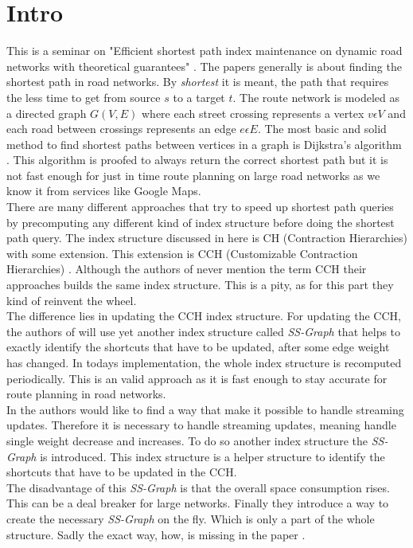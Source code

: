 \documentclass[twocolumn]{article}
\begin{document}


\section{Intro}

This is a seminar on "Efficient shortest path index maintenance on dynamic
road networks with theoretical guarantees" \cite{Ouyang2020}. The papers generally is
about finding the shortest path in road networks. By \textit{shortest} it is meant,
the path that requires the less time to get from source $s$ to a target $t$. The route
network is modeled as a directed graph $G(V,E)$ where each street crossing represents a
vertex $v \epsilon V$ and each road between crossings represents an edge $e \epsilon E$.
The most basic and solid method to find shortest paths between vertices in a graph is
Dijkstra's algorithm \cite{Dijkstra1959}. This algorithm is proofed to always return the
correct shortest path but it is not fast enough for just in time route planning on large
road networks as we know it from services like Google Maps.
\\
There are many
different approaches that try to speed up shortest path queries by precomputing
any different kind of index structure before doing the shortest path query. The index
structure discussed in here \cite{Ouyang2020} is CH (Contraction Hierarchies)\cite{Geisberger2012}
with some extension. This extension is CCH (Customizable Contraction Hierarchies)
\cite{Dibbelt2014}. Although the authors of \cite{Ouyang2020} never mention the term
CCH their approaches builds the same index structure. This is a pity, as for this part
they kind of reinvent the wheel.
\\
The difference lies in updating
the CCH index structure. For updating the CCH, the authors of \cite{Ouyang2020} will use yet another
index structure called \textit{SS-Graph} that helps to exactly identify the shortcuts that
have to be updated, after some edge weight has changed. In todays implementation, the whole
index structure is recomputed periodically. This is an valid approach as it is fast enough
to stay accurate for route planning in road networks.
\\
In \cite{Ouyang2020} the authors would like to find a way that make it possible to handle streaming
updates. Therefore it is necessary to handle streaming updates, meaning handle single weight decrease
and increases. To do so another index structure the \textit{SS-Graph} is introduced.
This index structure is a helper structure to identify the shortcuts
that have to be updated in the CCH.
\\
The disadvantage of this \textit{SS-Graph} is that the overall space consumption rises.
This can be a deal breaker for large networks.
Finally they introduce a way to create the necessary \textit{SS-Graph} on the fly. Which
is only a part of the whole structure.
Sadly the exact way, how, is missing in the paper \cite{Ouyang2020}.
\end{document}
